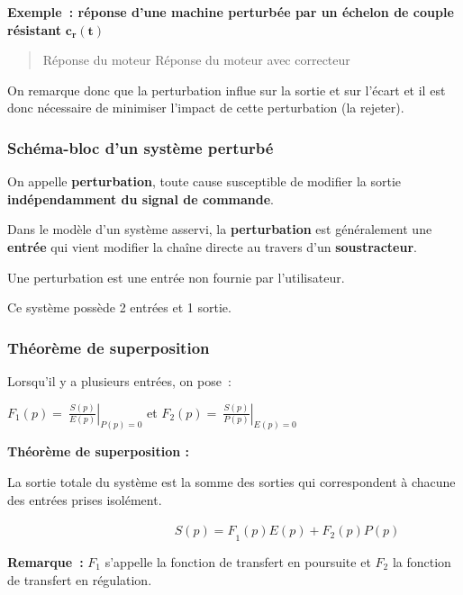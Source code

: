 \textbf{Exemple~: réponse d'une machine perturbée par un échelon de couple résistant} \(\mathbf{c}_{\mathbf{r}}\mathbf{(t)}\)

\begin{quote}
Réponse du moteur Réponse du moteur avec correcteur
\end{quote}

On remarque donc que la perturbation influe sur la sortie et sur l'écart et il est donc nécessaire de minimiser l'impact de cette perturbation (la rejeter).

\hypertarget{mod-schuxe9ma-bloc-dun-systuxe8me-perturbuxe9}{%
\subsubsection{Schéma-bloc d'un système perturbé}\label{mod-schuxe9ma-bloc-dun-systuxe8me-perturbuxe9}}

\TLSchemaPerturbe


On appelle \textbf{perturbation}, toute cause susceptible de modifier la sortie \textbf{indépendamment du signal de commande}.

Dans le modèle d'un système asservi, la \textbf{perturbation} est généralement une \textbf{entrée} qui vient modifier la chaîne directe au travers d'un \textbf{soustracteur}.

Une perturbation est une entrée non fournie par l'utilisateur.

Ce système possède 2 entrées et 1 sortie.

\hypertarget{mod-thuxe9oruxe8me-de-superposition}{%
\subsubsection{Théorème de superposition}\label{mod-thuxe9oruxe8me-de-superposition}}

Lorsqu'il y a plusieurs entrées, on pose~:

\(F_{1}(p) = \left. \ \frac{S(p)}{E(p)} \right|_{P(p) = 0}\) et \(F_{2}(p) = \left. \ \frac{S(p)}{P(p)} \right|_{E(p) = 0}\)

\textbf{Théorème de superposition :}

La sortie totale du système est la somme des sorties qui correspondent à chacune des entrées prises isolément.

\(\ \ \ \ \ \ \ \ \ \ \ \ \ \ \ \ \ \ \ \ \ \ \ \ \ \ \ \ \ \ \ \ \ \ \ \ \ \ \ \ \ \ \ \ \ \ \ \ \ \ \ \ \ \ \ \ \ \ \ \ {S(p) = F}_{1}(p)E(p) + F_{2}(p)P(p)\)

\textbf{Remarque~:} \(F_{1}\) s'appelle la fonction de transfert en poursuite et \(F_{2}\) la fonction de transfert en régulation.

